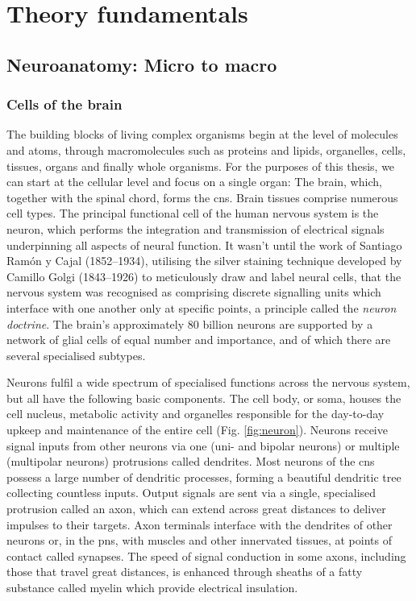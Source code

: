 
\chapter{Theory fundamentals}
\label{theory}

\section{Neuroanatomy: Micro to macro}

\subsection{Cells of the brain}

The building blocks of living complex organisms begin at the level of molecules and atoms, through macromolecules such as proteins and lipids, organelles, cells, tissues, organs and finally whole organisms.
For the purposes of this thesis, we can start at the cellular level and focus on a single organ:
The brain, which, together with the spinal chord, forms the \gls{cns}.
Brain tissues comprise numerous cell types.
The principal functional cell of the human nervous system is the neuron, which performs the integration and transmission of electrical signals underpinning all aspects of neural function.
It wasn't until the work of Santiago Ramón y Cajal (1852--1934), utilising the silver staining technique developed by Camillo Golgi (1843--1926) to meticulously draw and label neural cells, that the nervous system was recognised as comprising discrete signalling units which interface with one another only at specific points, a principle called the \textit{neuron doctrine}.\autocite{Kandel2021a}
The brain's approximately 80 billion neurons are supported by a network of glial cells of equal number and importance,\autocite{Herculano-Houzel2014,vonBartheld2016} and of which there are several specialised subtypes.

Neurons fulfil a wide spectrum of specialised functions across the nervous system, but all have the following basic components.
The cell body, or soma, houses the cell nucleus, metabolic activity and organelles responsible for the day-to-day upkeep and maintenance of the entire cell (Fig. \ref{fig:neuron}).
Neurons receive signal inputs from other neurons via one (uni- and bipolar neurons) or multiple (multipolar neurons) protrusions called dendrites.
Most neurons of the \gls{cns} possess a large number of dendritic processes, forming a beautiful dendritic tree collecting countless inputs.
Output signals are sent via a single, specialised protrusion called an axon, which can extend across great distances to deliver impulses to their targets.
Axon terminals interface with the dendrites of other neurons or, in the \gls{pns}, with muscles and other innervated tissues, at points of contact called synapses.
The speed of signal conduction in some axons, including those that travel great distances, is enhanced through sheaths of a fatty substance called myelin which provide electrical insulation.

